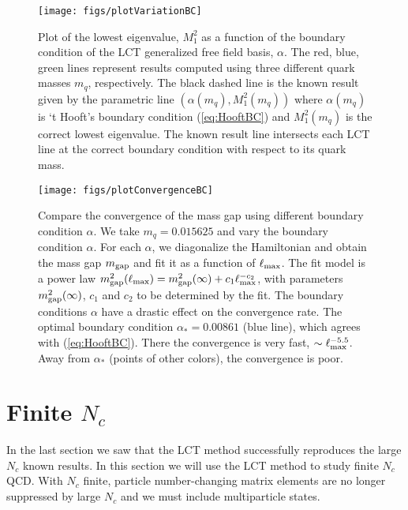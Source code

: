 \documentclass[12pt]{article}
\newcommand{\Nc}{N_c}
\begin{document}
\begin{figure}[htbp]
\centering
\texttt{[image: figs/plotVariationBC]}
\caption{
\label{fig:plotVariationBC}
Plot of the lowest eigenvalue, $M_1^{2}$ as a function of the boundary condition of the LCT generalized free field basis, $\alpha$. The red, blue, green lines represent results computed using three different quark masses $m_q$, respectively. The black dashed line is the known result given by the parametric line $(\alpha(m_q),M_1^2(m_q))$ where $\alpha(m_q)$ is `t Hooft's boundary condition (\ref{eq:HooftBC}) and $M_1^2(m_q)$ is the correct lowest eigenvalue. 
The known result line intersects each LCT line at the correct boundary condition with respect to its quark mass.
}
\end{figure}



\begin{figure}[htbp]
\centering
\texttt{[image: figs/plotConvergenceBC]}
\caption{
\label{fig:plotConvergenceBC}
Compare the convergence of the mass gap using different boundary condition $\alpha$. We take $m_q=0.015625$ and vary the boundary condition $\alpha$. 
For each $\alpha$, we diagonalize the Hamiltonian and obtain the mass gap $m_{\rm gap}$ and fit it as a function of $\ell_{\rm max}$. The fit model is a power law $m_{\rm gap}^2(\ell_{\rm max}) = m_{\rm gap}^2(\infty) + c_1 \ell_{\rm max}^{-c_2}$, with parameters $m_{\rm gap}^2(\infty)$, $c_1$ and $c_2$ to be determined by the fit. The boundary conditions $\alpha$ have a drastic effect on the convergence rate. The optimal boundary condition $\alpha_* = 0.00861$ (blue line), which agrees with (\ref{eq:HooftBC}). There the convergence is very fast, $\sim \ell_{\rm max}^{-5.5}$. Away from $\alpha_*$ (points of other colors), the convergence is poor.
}
\end{figure}




\section{Finite $N_c$}
\label{finiteNbasis}

In the last section we saw that the LCT method successfully reproduces the large $\Nc$ known results. In this section we will use the LCT method to study finite $\Nc$ QCD.   With $\Nc$ finite, particle number-changing matrix elements are no longer suppressed by large $\Nc$ and we must include multiparticle states. 
\end{document}
